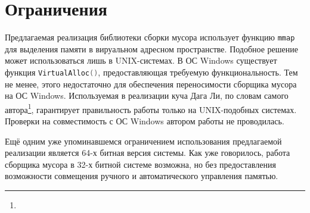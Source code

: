 \section{Ограничения}

Предлагаемая реализация библиотеки сборки мусора использует функцию \lstinline[language= cpp]{mmap} для выделения памяти в
вируальном адресном пространстве. Подобное решение может использоваться лишь в UNIX-системах.
В ОС Windows существует функция \lstinline[language= cpp]{VirtualAlloc()}, предоставляющая требуемую функциональность.
Тем не менее, этого недостаточно для обеспечения переносимости сборщика мусора на ОС Windows.
Используемая в реализации куча Дага Ли, по словам самого автора\footnote{},
гарантирует правильность работы только на UNIX-подобных системах.
Проверки на совместимость с ОС Windows автором работы не проводилась.

Ещё одним уже упоминавшемся ограничением использования предлагаемой реализации является 64-х битная версия системы.
Как уже говорилось, работа сборщика мусора в 32-х битной системе возможна, но без предоставления возможности
совмещения ручного и автоматического управления памятью.